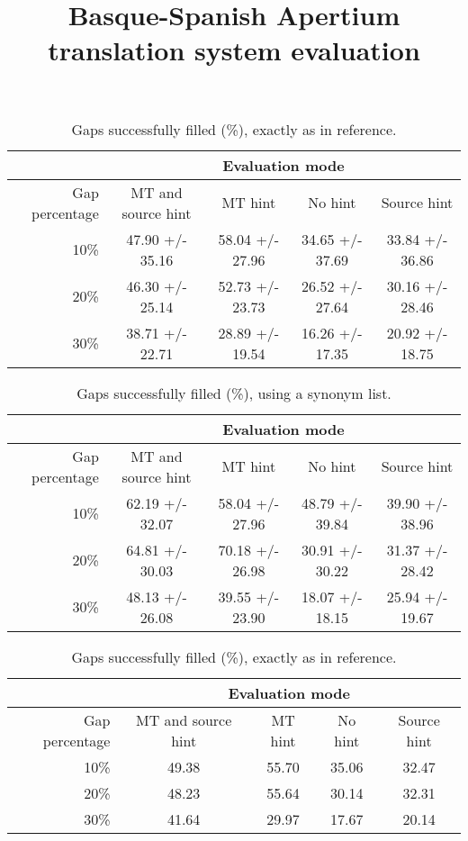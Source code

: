 \documentclass[11pt, oneside]{article}   	%
\title{Basque-Spanish Apertium translation system evaluation}
\begin{document}

\begin{table}
\centering
\begin{tabular}{|r |*{4}{c}|}
\hline
 &\multicolumn{4}{c|}{Evaluation mode}\\
\hline
Gap percentage & MT and source hint & MT hint & No hint & Source hint\\
\hline
10\%&47.90 +/- 35.16&58.04 +/- 27.96&34.65 +/- 37.69&33.84 +/- 36.86\\
20\%&46.30 +/- 25.14&52.73 +/- 23.73&26.52 +/- 27.64&30.16 +/- 28.46\\
30\%&38.71 +/- 22.71&28.89 +/- 19.54&16.26 +/- 17.35&20.92 +/- 18.75\\
\hline
\end{tabular}
\caption {Gaps successfully filled (\%), exactly as in reference.} \label{tab:title} 
\end{table}

\begin{table}
\centering
\begin{tabular}{|r |*{4}{c}|}
\hline
 &\multicolumn{4}{c|}{Evaluation mode}\\
\hline
Gap percentage & MT and source hint & MT hint & No hint & Source hint\\
\hline
10\%&62.19 +/- 32.07&58.04 +/- 27.96&48.79 +/- 39.84&39.90 +/- 38.96\\
20\%&64.81 +/- 30.03&70.18 +/- 26.98&30.91 +/- 30.22&31.37 +/- 28.42\\
30\%&48.13 +/- 26.08&39.55 +/- 23.90&18.07 +/- 18.15&25.94 +/- 19.67\\
\hline
\end{tabular}
\caption {Gaps successfully filled (\%), using a synonym list.} \label{tab:title} 
\end{table}


\begin{table}
\centering
\begin{tabular}{|r |*{4}{c}|}
\hline
 &\multicolumn{4}{c|}{Evaluation mode}\\
\hline
Gap percentage & MT and source hint & MT hint & No hint & Source hint\\
\hline
10\%&49.38&55.70&35.06&32.47\\
20\%&48.23&55.64&30.14&32.31\\
30\%&41.64&29.97&17.67&20.14\\
\hline
\end{tabular}
\caption {Gaps successfully filled (\%), exactly as in reference.} \label{tab:title}
\end{table}
\end{document}
